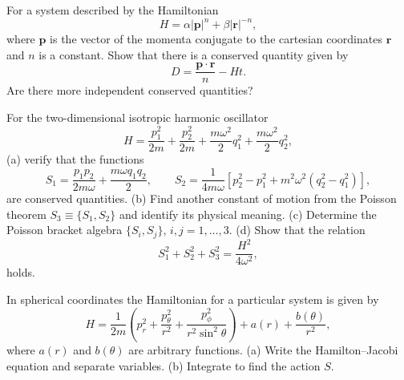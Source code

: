 \documentclass[12pt]{article}
\newenvironment{problem}[2][Problem]{\begin{trivlist}
\item[\hskip \labelsep {\bfseries #1}\hskip \labelsep {\bfseries #2.}]}{\end{trivlist}}
\begin{document}
\begin{problem}{5}
For a system described by the Hamiltonian
\begin{equation}
H=\alpha |\mathbf{p}|^n + \beta  |\mathbf{r}|^{-n},
\end{equation}
where $\mathbf{p}$ is the vector of the momenta conjugate to the cartesian coordinates $\mathbf{r}$ and $n$ is a constant. Show that there is a conserved quantity given by
\begin{equation}
D=\frac{\mathbf{p}\cdot\mathbf{r}}{n}-Ht.
\end{equation}
Are there more independent conserved quantities? 
\end{problem}

\begin{problem}{6}
For the two-dimensional isotropic harmonic oscillator 
\begin{equation}
H=\frac{p_1^2}{2m}+\frac{p_2^2}{2m} + \frac{m \omega^2}{2}q_1^2 +\frac{m \omega^2}{2}q_2^2,
\end{equation}
(a) verify that the functions 
\begin{equation}
S_1=\frac{p_1p_2}{2 m \omega}+\frac{m\omega q_1 q_2}{2} ,\qquad S_2=\frac{1}{4 m\omega}\left[p_2^2 - p_1^2+m^2\omega^2(q_2^2 - q_1^2) \right],
\end{equation}
are conserved quantities. (b) Find another constant of motion from the Poisson theorem $S_3\equiv\{S_1,S_2\}$ and identify its physical meaning. (c) Determine the Poisson bracket algebra $\{S_i,S_j\}$, $i,j=1,\dots,3$. (d) Show that the relation
\begin{equation}
S_1^2+S_2^2+S_3^2=\frac{H^2}{4\omega^2},
\end{equation} 
holds.
\end{problem}

\begin{problem}{7}
In spherical coordinates the Hamiltonian for a particular system is given by
\begin{equation}
H=\frac{1}{2m}\left(p_r^2+\frac{p_\theta^2}{r^2}+\frac{p_\phi^2}{r^2\sin^2\theta}\right)+a(r)+\frac{b(\theta)}{r^2},
\end{equation}
where $a(r)$ and $b(\theta)$ are arbitrary functions.
(a) Write the Hamilton–Jacobi equation and separate variables. (b) Integrate to find the action $S$.
\end{problem}

 
\end{document}
